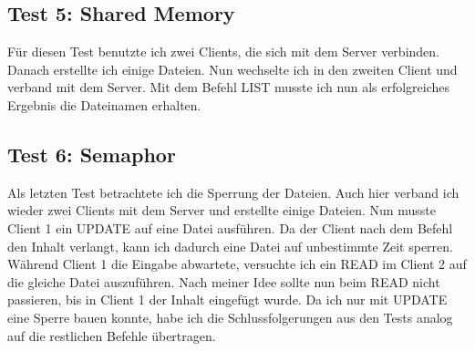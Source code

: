 \documentclass[12pt,a4paper,ngerman]{report}
\begin{document}
\subsection{Test 5: Shared Memory}
Für diesen Test benutzte ich zwei Clients, die sich mit dem Server verbinden. Danach erstellte ich einige Dateien. Nun wechselte ich in den zweiten Client und verband mit dem Server. Mit dem Befehl LIST musste ich nun als erfolgreiches Ergebnis die Dateinamen erhalten. 
\subsection{Test 6: Semaphor}
Als letzten Test betrachtete ich die Sperrung der Dateien. Auch hier verband ich wieder zwei Clients mit dem Server und erstellte einige Dateien. Nun musste Client 1 ein UPDATE auf eine Datei ausführen. Da der Client nach dem Befehl den Inhalt verlangt, kann ich dadurch eine Datei auf unbestimmte Zeit sperren. Während Client 1 die Eingabe abwartete, versuchte ich ein READ im Client 2 auf die gleiche Datei auszuführen. Nach meiner Idee sollte nun beim READ nicht passieren, bis in Client 1 der Inhalt eingefügt wurde. Da ich nur mit UPDATE eine Sperre bauen konnte, habe ich die Schlussfolgerungen aus den Tests analog auf die restlichen Befehle übertragen.
\end{document}
